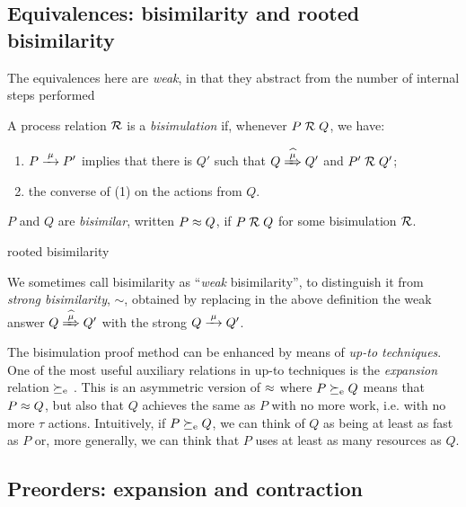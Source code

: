 \subsection{Equivalences: bisimilarity and rooted bisimilarity}
\label{ss:BiEx}

The equivalences here are 
 \emph{weak}, in that they
abstract from the number of internal steps performed
\begin{definition}[bisimilarity]
\label{d:wb}
A process relation ${{\cal R}}$ 
 is a \emph{bisimulation} if, whenever
 $P\mathrel{\cal R} Q$, %
we have:
\begin{enumerate}
\item 
    $P \arr\mu P'$   implies that there is $Q'$ such that $Q \Arcap
\mu Q'$ and $P' 
\mathrel{\cal R} Q'$;

\item the converse of (1)
 on the actions from $Q$.
\end{enumerate}  
 $P$ and $Q$ are \emph{bisimilar},
written $P \approx
 Q$, if $P \mathrel{\cal R} Q$ for some  bisimulation ${\cal R}$.  
\end{definition} 

\begin{definition}{rooted bisimilarity}

\end{definition}

We sometimes call bisimilarity as ``\emph{weak} bisimilarity'', to
distinguish it from \emph{strong bisimilarity}, $\sim$,
obtained by replacing in the above definition   the weak answer $
Q\Arcap\mu Q'$ with the strong  $Q \arr \mu Q'$.

The bisimulation proof method can be enhanced by means of \emph{up-to
  techniques}. One of the most useful auxiliary relations in up-to
techniques  is the \emph{expansion} relation  $\mathrel{\succeq_{\rm{e}}}$ \cite{SaMi92}. This is an asymmetric version
of $\approx$ where $P \mathrel{\succeq_{\rm{e}}} Q$  means that 
 $P \approx Q$,
but also that $Q$  achieves  the same as  $P$ 
with  no more work, i.e. with no more $\tau$ actions.
Intuitively, if $ P \mathrel{\succeq_{\rm{e}}} Q$, we can think of $Q$ as being 
at least as fast as $P$
or, more generally, we can think that $P$  uses at least as many resources as $Q$. 



\subsection{Preorders: expansion and contraction}


